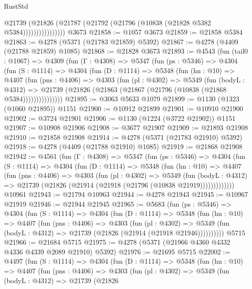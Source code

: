 \begin{lexlean}{RustStd}
\begin{coremodule}
                      @21739
                        (@21826 (@21787 (@21792 (@21796 (@10838 (@21828 @5382 @5384))))))))))))))))
    @3673
@21858 := @1057 @3673
@21859 := @21858 @5384
@21863 := @4278 (@5371 (@21783 @21859) @5392)
@21867 := @4278 (@4409 (@21788 @21859) @1085)
@21868 := @21828 @3673
@21893 := @4543
    (fun (tail0 : @1067) =>
    @4309
      (fun (Γ : @4308) =>
      @5347
        (fun (ps : @5346) =>
        @4304
          (fun (S : @1114) =>
          @4304
            (fun (D : @1114) =>
            @5348
              (fun (hn : @10) =>
              @4407
                (fun (pns : @4406) =>
                @4303
                  (fun (pl : @4302) =>
                  @5349
                    (fun (bodyL : @4312) =>
                    @21739 (@21826 (@21863 (@21867 (@21796 (@10838 (@21868 @5384)))))))))))))))
@21895 := @3063 @5633 @1079
@21899 := @1130 (@1323 (@1060 @21895)) @1151
@21900 := @10912 @21899
@21901 := @10910 @21900
@21902 := @3724 @21901
@21906 := @1130 (@1224 (@3722 @21902)) @1151
@21907 := @10908 @21906
@21908 := @3677 @21907
@21909 := @21893 @21908
@21910 := @21858 @21908
@21914 := @4278 (@5371 (@21783 @21910) @5392)
@21918 := @4278 (@4409 (@21788 @21910) @1085)
@21919 := @21868 @21908
@21942 := @4561
    (fun (Γ : @4308) =>
    @5347
      (fun (ps : @5346) =>
      @4304
        (fun (S : @1114) =>
        @4304
          (fun (D : @1114) =>
          @5348
            (fun (hn : @10) =>
            @4407
              (fun (pns : @4406) =>
              @4303
                (fun (pl : @4302) =>
                @5349
                  (fun (bodyL : @4312) =>
                  @21739 (@21826 (@21914 (@21918 (@21796 (@10838 @21919)))))))))))))
    @10961
@21943 := @21794 @10963
@21944 := @4278 @21943
@21945 := @10967 @21919
@21946 := @21944 @21945
@21965 := @5683
    (fun (ps : @5346) =>
    @4304
      (fun (S : @1114) =>
      @4304
        (fun (D : @1114) =>
        @5348
          (fun (hn : @10) =>
          @4407
            (fun (pns : @4406) =>
            @4303
              (fun (pl : @4302) =>
              @5349 (fun (bodyL : @4312) => @21739 (@21826 (@21914 (@21918 @21946))))))))))
    @5715
@21966 := @21684 @5715
@21975 := @4278 (@5371 (@21966 @4360 @4332 @4336 @4339 @2089 @21910) @5392)
@21976 := @21695 @5715
@22002 := @4497
    (fun (S : @1114) =>
    @4304
      (fun (D : @1114) =>
      @5348
        (fun (hn : @10) =>
        @4407
          (fun (pns : @4406) =>
          @4303
            (fun (pl : @4302) =>
            @5349
              (fun (bodyL : @4312) =>
              @21739
                (@21826

\end{coremodule}
\end{lexlean}
